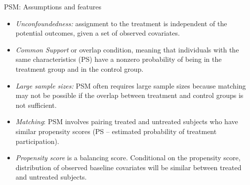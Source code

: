 \documentclass{beamer}
\begin{document}
\begin{frame}{PSM: Assumptions and features}
\begin{itemize}
    \item \emph{Unconfoundedness:} assignment to the treatment is independent of the potential outcomes, given a set of observed covariates.
    \item \emph{Common Support} or overlap condition, meaning that individuals with the same characteristics (PS) have a nonzero probability of being in the treatment group and in the control group.
    \item \emph{Large sample sizes:} PSM often requires large sample sizes because matching may not be possible if the overlap between treatment and control groups is not sufficient.
    \bigskip
    \item \emph{Matching}: PSM involves pairing treated and untreated subjects who have similar propensity scores (PS -- estimated probability of treatment participation).
    \item \emph{Propensity score} is a balancing score. Conditional on the propensity score, distribution of observed baseline covariates will be similar between treated and untreated subjects.
\end{itemize}
\end{frame}
\end{document}
